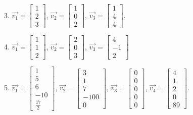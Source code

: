 \documentclass{article}
\begin{document}
3. $\vec{v_1} = \left[\begin{array}{c} 1 \\ 2 \\ 3 \end{array}\right]$, $\vec{v_2} = \left[\begin{array}{c} 1 \\ 0 \\ 2 \end{array}\right]$, $\vec{v_3} = \left[\begin{array}{c} 1 \\ 4 \\ 4 \end{array}\right]$.

4. $\vec{v_1} = \left[\begin{array}{c} 1 \\ 1 \\ 2 \end{array}\right]$, $\vec{v_2} = \left[\begin{array}{c} 2 \\ 0 \\ 3 \end{array}\right]$, $\vec{v_3} = \left[\begin{array}{c} 4 \\ - 1 \\ 2 \end{array}\right]$

5. $\vec{v_1} = \left[\begin{array}{c} 1 \\ 5 \\ 6 \\ -10 \\ \frac{17}{2} \end{array}\right]$, $\vec{v_2} = \left[\begin{array}{c} 3 \\ 1 \\ 7 \\ -100 \\ 0\end{array}\right]$, $\vec{v_3} = \left[\begin{array}{c} 0 \\ 0 \\ 0 \\ 0 \\ 0 \end{array}\right]$, $\vec{v_4} = \left[\begin{array}{c} 4 \\ 1 \\ 2 \\ 0 \\ 89 \end{array}\right]$.
\end{document}
